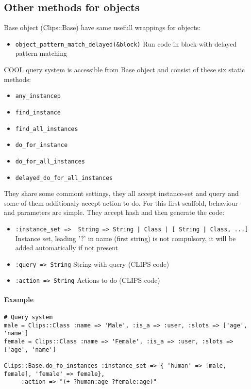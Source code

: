 \documentclass[a4paper,10pt]{article}
\begin{document}
\subsection{Other methods for objects}
Base object (Clips::Base) have same usefull wrappings for objects:
\begin{itemize}
 \item \texttt{object\_pattern\_match\_delayed(\&block)} Run code in block with delayed pattern matching
\end{itemize}

COOL query system is accessible from Base object and consist of these six static methods:
\begin{itemize}
 \item \texttt{any\_instancep}
 \item \texttt{find\_instance}
 \item \texttt{find\_all\_instances}
 \item \texttt{do\_for\_instance} 
 \item \texttt{do\_for\_all\_instances}
 \item \texttt{delayed\_do\_for\_all\_instances}
\end{itemize}

They share some commont settings, they all accept instance-set and query and some of them additionaly accept action to do. For this first scaffold, behaviour and parameters are simple. They accept hash and then generate the code:
\begin{itemize}
 \item \texttt{:instance\_set => { String => String | Class | [ String | Class, ...]}} Instance set, leading '?' in name (first string) is not compulsory, it will be added automatically if not present
 \item \texttt{:query => String} String with query (CLIPS code)
 \item \texttt{:action => String} Actions to do (CLIPS code)
\end{itemize}

\paragraph{Example}
\begin{verbatim}
# Query system
male = Clips::Class :name => 'Male', :is_a => :user, :slots => ['age', 'name']
female = Clips::Class :name => 'Female', :is_a => :user, :slots => ['age', 'name']

Clips::Base.do_fo_instances :instance_set => { 'human' => [male, female], 'female' => female},
	 :action => "(+ ?human:age ?female:age)"
\end{verbatim}
\end{document}
